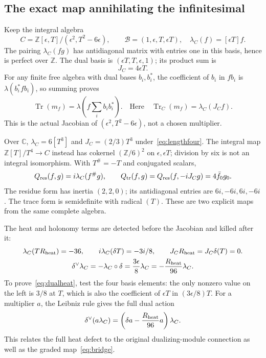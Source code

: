 \documentclass[11pt,a4paper]{article}
\theoremstyle{definition}\newtheorem{definition}[theorem]{Definition}\newtheorem{remark}[theorem]{Remark}
\newcommand{\C}{\mathbb C}\newcommand{\R}{\mathbb R}\newcommand{\Z}{\mathbb Z}\newcommand{\B}{\mathbb B}
\newcommand{\Tr}{\operatorname{Tr}}\newcommand{\im}{\operatorname{im}}\newcommand{\diag}{\operatorname{diag}}\newcommand{\rad}{\operatorname{rad}}\newcommand{\Spec}{\operatorname{Spec}}\newcommand{\Ann}{\operatorname{Ann}}\newcommand{\Disc}{\operatorname{Disc}}\newcommand{\Hom}{\operatorname{Hom}}\newcommand{\Res}{\operatorname{Res}}
\begin{document}
\subsection{The exact map annihilating the infinitesimal}
Keep the integral algebra
\begin{equation}
 C=\Z[\epsilon,T]/(\epsilon^2,T^2-6\epsilon),\qquad
 \mathcal B=(1,\epsilon,T,\epsilon T),\quad
 \lambda_C(f)=[\epsilon T]f.                             \label{eq:integralC}
\end{equation}
The pairing $\lambda_C(fg)$ has antidiagonal matrix with entries one in this basis, hence is perfect over $\Z$. The dual basis is $(\epsilon T,T,\epsilon,1)$; its product sum is
\[
 J_C=4\epsilon T.
\]
For any finite free algebra with dual bases $b_i,b_i^*$, the coefficient of $b_i$ in $fb_i$ is $\lambda(b_i^*fb_i)$, so summing proves
\begin{equation}
 \Tr(m_f)=\lambda\left(f\sum_i b_i b_i^*\right).
 \quad\text{Here}\quad\Tr_C(m_f)=\lambda_C(J_Cf).        \label{eq:tracejac}
\end{equation}
This is the actual Jacobian of $(\epsilon^2,T^2-6\epsilon)$, not a chosen multiplier.

Over $\C$, $\lambda_C=6[T^3]$ and $J_C=(2/3)T^3$ under~\eqref{eq:lengthfour}. The integral map $\Z[T]/T^4\to C$ instead has cokernel $(\Z/6)^2$ on $\epsilon,\epsilon T$; division by six is not an integral isomorphism. With $T^\#=-T$ and conjugated scalars,
\begin{equation}
 Q_{\rm res}(f,g)=i\lambda_C(f^\#g),\qquad
 Q_{\rm tr}(f,g)=Q_{\rm res}(f,-iJ_Cg)=4\bar f_0g_0.    \label{eq:duality}
\end{equation}
The residue form has inertia $(2,2,0)$; its antidiagonal entries are $6i,-6i,6i,-6i$. The trace form is semidefinite with radical $(T)$. These are two explicit maps from the same complete algebra.

The heat and holonomy terms are detected before the Jacobian and killed after it:
\begin{gather}
 \lambda_C(T R_{\rm heat})=-36,\qquad
 i\lambda_C(\delta T)=-3i/8,\qquad
 J_C R_{\rm heat}=J_C\delta(T)=0.                        \label{eq:detected}\\
 \delta^\vee\lambda_C=-\lambda_C\circ\delta
  =\frac{3\epsilon}{8}\lambda_C
  =-\frac{R_{\rm heat}}{96}\lambda_C.                   \label{eq:dualheat}
\end{gather}
To prove~\eqref{eq:dualheat}, test the four basis elements: the only nonzero value on the left is $3/8$ at $T$, which is also the coefficient of $\epsilon T$ in $(3\epsilon/8)T$. For a multiplier $a$, the Leibniz rule gives the full dual action
\[
 \delta^\vee(a\lambda_C)=
 \left(\delta a-\frac{R_{\rm heat}}{96}a\right)\lambda_C.
\]
This relates the full heat defect to the original dualizing-module connection as well as the graded map~\eqref{eq:bridge}.
\end{document}
